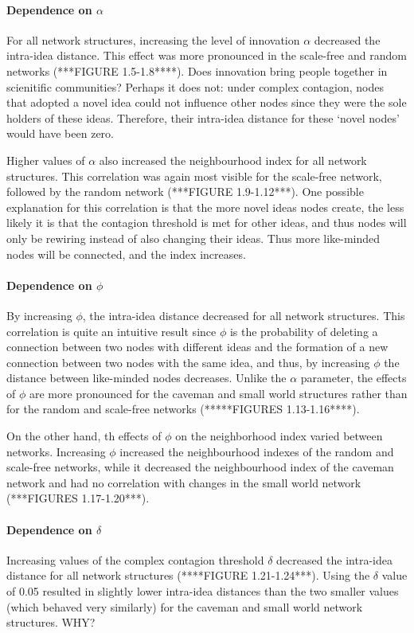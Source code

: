 \paragraph{Dependence on $\alpha$}
For all network structures, increasing the level of innovation $\alpha$ decreased the intra-idea distance. This effect was more pronounced in the scale-free and random networks (***FIGURE 1.5-1.8****). Does innovation bring people together in scienitific communities? Perhaps it does not: under complex contagion, nodes that adopted a novel idea could not influence other nodes since they were the sole holders of these ideas. Therefore, their intra-idea distance for these `novel nodes' would have been zero. 

Higher values of $\alpha$ also increased the neighbourhood index for all network structures. This correlation was again most visible for the scale-free network, followed by the random network (***FIGURE 1.9-1.12***). One possible explanation for this correlation is that the more novel ideas nodes create, the less likely it is that the contagion threshold is met for other ideas, and thus nodes will only be rewiring instead of also changing their ideas. Thus more like-minded nodes will be connected, and the index increases. 


\paragraph{Dependence on $\phi$}
By increasing $\phi$, the intra-idea distance decreased for all network structures. This correlation is quite an intuitive result since $\phi$ is the probability of deleting a connection between two nodes with different ideas and the formation of a new connection between two nodes with the same idea, and thus, by increasing $\phi$ the distance between like-minded nodes decreases. Unlike the $\alpha$ parameter, the effects of $\phi$ are more pronounced for the caveman and small world structures rather than for the random and scale-free networks (*****FIGURES 1.13-1.16****).

On the other hand, th effects of $\phi$ on the neighborhood index varied between networks. Increasing $\phi$ increased the neighbourhood indexes of the random and scale-free networks, while it decreased the neighbourhood index of the caveman network and had no correlation with changes in the small world network (***FIGURES 1.17-1.20***).

\paragraph{Dependence on $\delta$}
Increasing values of the complex contagion threshold $\delta$ decreased the intra-idea distance for all network structures (****FIGURE 1.21-1.24***). Using the $\delta$ value of 0.05 resulted in slightly lower intra-idea distances than the two smaller values (which behaved very similarly) for the caveman and small world network structures. WHY?

